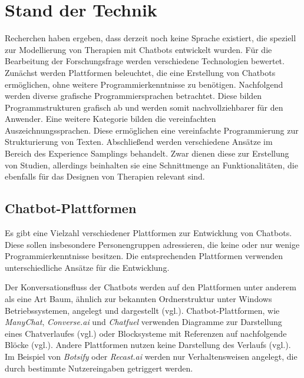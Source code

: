 
\section{Stand der Technik}
\label{ch:Forschungsstand}
Recherchen haben ergeben, dass derzeit noch keine Sprache existiert, die speziell zur Modellierung von Therapien mit Chatbots entwickelt wurden. Für die Bearbeitung der Forschungsfrage werden verschiedene Technologien bewertet. Zunächst werden Plattformen beleuchtet, die eine Erstellung von Chatbots ermöglichen, ohne weitere Programmierkenntnisse zu benötigen. Nachfolgend werden diverse grafische Programmiersprachen betrachtet. Diese bilden Programmstrukturen grafisch ab und werden somit nachvollziehbarer für den Anwender. Eine weitere Kategorie bilden die vereinfachten Auszeichnungssprachen. Diese ermöglichen eine vereinfachte Programmierung zur Strukturierung von Texten. Abschließend werden verschiedene Ansätze im Bereich des Experience Samplings behandelt. Zwar dienen diese zur Erstellung von Studien, allerdings beinhalten sie eine Schnittmenge an Funktionalitäten, die ebenfalls für das Designen von Therapien relevant sind. 

\subsection{Chatbot-Plattformen}
Es gibt eine Vielzahl verschiedener Plattformen zur Entwicklung von Chatbots. Diese sollen insbesondere Personengruppen adressieren, die keine oder nur wenige Programmierkenntnisse besitzen. Die entsprechenden Plattformen verwenden unterschiedliche Ansätze für die Entwicklung. 

Der Konversationsfluss der Chatbots werden auf den Plattformen unter anderem als eine Art Baum, ähnlich zur bekannten Ordnerstruktur unter Windows Betriebssystemen, angelegt und dargestellt (vgl.\cite{Dialogfl40:online}\cite{KatalogI56:online}). Chatbot-Plattformen, wie \emph{ManyChat}, \emph{Converse.ai} und \emph{Chatfuel} verwenden Diagramme zur Darstellung eines Chatverlaufes (vgl.\cite{Converse15:online}\cite{WelcomeM66:online}) oder Blocksysteme mit Referenzen auf nachfolgende Blöcke (vgl.\cite{Chatfuel3:online}). Andere Plattformen nutzen keine Darstellung des Verlaufs (vgl.\cite{BotsifyC64:online}). Im Beispiel von \emph{Botsify} oder \emph{Recast.ai} werden nur Verhaltensweisen angelegt, die durch bestimmte Nutzereingaben getriggert werden. 

